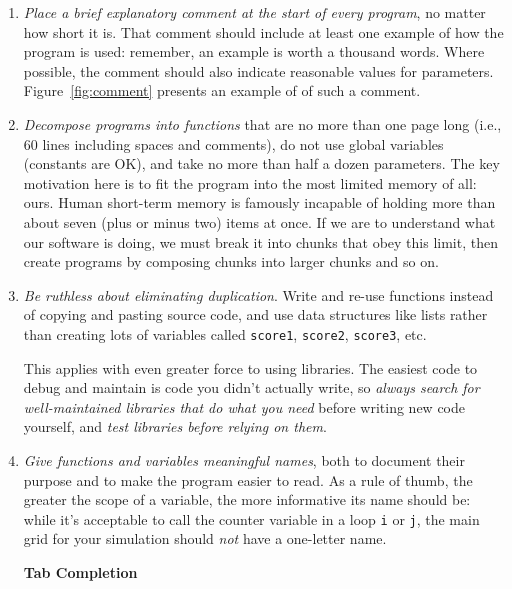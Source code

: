 \documentclass[10pt]{article}
\newcommand{\recommend}[1]{\textit{#1}}
\begin{document}
\begin{enumerate}

\item  
  \recommend{Place a brief explanatory comment at the start of
    every program}, no matter how short it is. That comment should
  include at least one example of how the program is used: remember, an
  example is worth a thousand words. Where possible, the comment should
  also indicate reasonable values for parameters.  Figure~\ref{fig:comment}
  presents an example of of such a comment.

\item
  \recommend{Decompose programs into functions} that
  are no more than one page long (i.e., 60 lines including spaces and comments),
  do not use global variables (constants are OK),
  and take no more than half a dozen parameters.
  The key motivation here is to fit the program into the most limited
  memory of all: ours. Human short-term memory is famously incapable of
  holding more than about seven (plus or minus two) items at once. If we
  are to understand what our software is doing, we must break it into
  chunks that obey this limit, then create programs by composing chunks
  into larger chunks and so on.

\item
  \recommend{Be ruthless about eliminating duplication}. Write and
  re-use functions instead of copying and pasting source code, and use
  data structures like lists rather than creating lots of variables called
  \texttt{score1}, \texttt{score2}, \texttt{score3}, etc.

  This applies with even greater force to using libraries. The easiest
  code to debug and maintain is code you didn't actually write, so
  \recommend{always search for well-maintained libraries that do what
    you need} before writing new code yourself, and \recommend{test
    libraries before relying on them}.

\item
  \recommend{Give functions and variables meaningful names}, both to
  document their purpose and to make the program easier to read. As a rule
  of thumb, the greater the scope of a variable, the more informative its
  name should be: while it's acceptable to call the counter variable in a
  loop \texttt{i} or \texttt{j}, the main grid for your simulation should
  \emph{not} have a one-letter name.

  \begin{framed}
    \noindent \textbf{Tab Completion}


\end{framed}
\end{enumerate}
\end{document}
